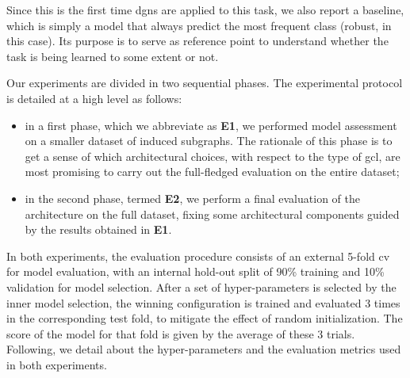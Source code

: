 Since this is the first time \glspl{dgn} are applied to this task, we also report a baseline, which is simply a model that always predict the most frequent class (robust, in this case). Its purpose is to serve as reference point to understand whether the task is being learned to some extent or not.

Our experiments are divided in two sequential phases. The experimental protocol is detailed at a high level as follows:
\begin{itemize}
    \item in a first phase, which we abbreviate as \textbf{E1}, we performed model assessment on a smaller dataset of induced subgraphs. The rationale of this phase is to get a sense of which architectural choices, \eg with respect to the type of \gls{gcl}, are most promising to carry out the full-fledged evaluation on the entire dataset;
    \item in the second phase, termed \textbf{E2}, we perform a final evaluation of the architecture on the full dataset, fixing some architectural components guided by the results obtained in \textbf{E1}.
\end{itemize}
In both experiments, the evaluation procedure consists of an external 5-fold \gls{cv} for model evaluation, with an internal hold-out split of 90\% training and 10\% validation for model selection. After a set of hyper-parameters is selected by the inner model selection, the winning configuration is trained and evaluated 3 times in the corresponding test fold, to mitigate the effect of random initialization. The score of the model for that fold is given by the average of these 3 trials. Following, we detail about the hyper-parameters and the evaluation metrics used in both experiments.

